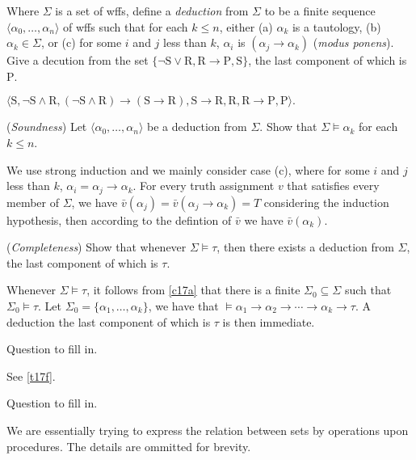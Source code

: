 \setcounter{exercise}{4}

\begin{exercise}
  Where $\Sigma$ is a set of wffs, define a \textit{deduction} from $\Sigma$ to be a finite sequence $\langle \alpha_0,\dots,\alpha_n\rangle$ of wffs such that for each $k\leq n$, either (a) $\alpha_k$ is a tautology, (b) $\alpha_k\in \Sigma$, or (c) for some $i$ and $j$ less than $k$, $\alpha_i$ is $(\alpha_j\rightarrow \alpha_k)$ (\textit{modus ponens}). Give a decution from the set $\{\mathrm{\neg S\vee R, R\rightarrow P, S}\}$, the last component of which is $\mathrm{P}$.
\end{exercise}

$\mathrm{\langle S,\neg S\wedge R, (\neg S\wedge R)\rightarrow(S\rightarrow R), S\rightarrow R, R, R\rightarrow P, P\rangle.}$

\begin{exercise}
  (\textit{Soundness}) Let $\langle \alpha_0,\dots,\alpha_n\rangle$ be a deduction from $\Sigma$. Show that $\Sigma\vDash \alpha_k$ for each $k\leq n$.
\end{exercise}

We use strong induction and we mainly consider case (c), where for some $i$ and $j$ less than $k$, $\alpha_i=\alpha_j\rightarrow \alpha_k$. For every truth assignment $v$ that satisfies every member of $\Sigma$, we have $\bar{v}(\alpha_j)=\bar{v}(\alpha_j\rightarrow \alpha_k)=T$ considering the induction hypothesis, then according to the defintion of $\bar{v}$ we have $\bar{v}(\alpha_k)$.

\begin{exercise}
  (\textit{Completeness}) Show that whenever $\Sigma\vDash \tau$, then there exists a deduction from $\Sigma$, the last component of which is $\tau$.
\end{exercise}

Whenever $\Sigma\vDash\tau$, it follows from \ref{c17a} that there is a finite $\Sigma_0\subseteq \Sigma$ such that $\Sigma_0\vDash\tau$. Let $\Sigma_0=\{\alpha_1,\dots,\alpha_k\}$, we have that $\vDash \alpha_1\rightarrow \alpha_2\rightarrow\cdots\rightarrow \alpha_k\rightarrow\tau$.  A deduction the last component of which is $\tau$ is then immediate.

\begin{exercise}
  Question to fill in.
\end{exercise}

See \ref{t17f}.

\setcounter{exercise}{10}

\begin{exercise}
  Question to fill in.
\end{exercise}

We are essentially trying to express the relation between sets by operations upon procedures. The details are ommitted for brevity.

